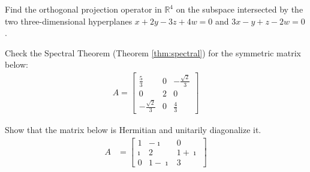 \begin{Exercise}
Find the orthogonal projection operator in $\mathbb{R}^4$ on the subspace intersected by the two three-dimensional hyperplanes $x + 2y - 3z + 4w = 0$ and $3x - y + z - 2w = 0$.
\end{Exercise}

\begin{Exercise}
Check the Spectral Theorem (Theorem \ref{thm:spectral}) for the symmetric matrix below:
\begin{align*}
A = 
\begin{bmatrix}
\frac{5}{3}&0&-\frac{\sqrt{2}}{3}\\ 
0&2&0\\ 
-\frac{\sqrt{2}}{3}&0&\frac{4}{3}
\end{bmatrix}
\end{align*}
\end{Exercise}

\begin{Exercise}
Show that the matrix below is Hermitian and unitarily diagonalize it.
\begin{align*}
A &=
\begin{bmatrix}
1 & -\imath & 0 \\
\imath & 2 & 1+\imath \\
0 & 1-\imath & 3 
\end{bmatrix}
\end{align*}
\end{Exercise}

